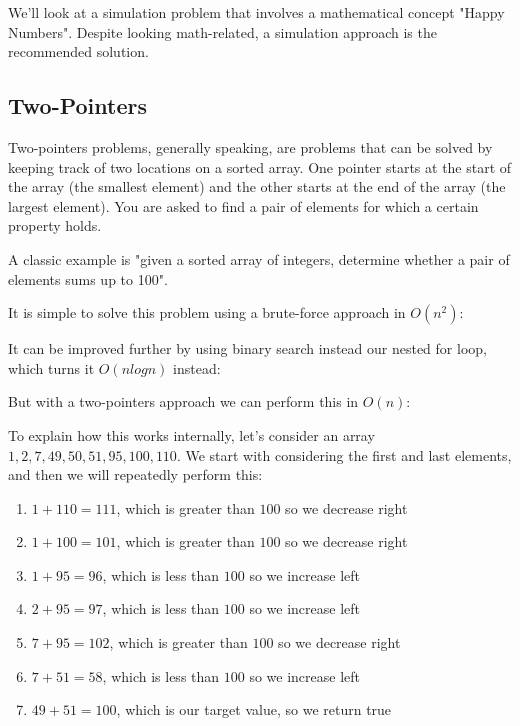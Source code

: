 We'll look at a simulation problem that involves a mathematical concept "Happy Numbers". Despite looking math-related, a simulation approach is the recommended solution.

\hrulefill



\hrulefill

\subsection{Two-Pointers}

Two-pointers problems, generally speaking, are problems that can be solved by keeping track of two locations on a sorted array. One pointer starts at the start of the array (the smallest element) and the other starts at the end of the array (the largest element). You are asked to find a pair of elements for which a certain property holds.

A classic example is "given a sorted array of integers, determine whether a pair of elements sums up to 100".

It is simple to solve this problem using a brute-force approach in $O(n^2)$:


It can be improved further by using binary search instead our nested for loop, which turns it $O(n log n)$ instead:


But with a two-pointers approach we can perform this in $O(n)$:


To explain how this works internally, let's consider an array $1,2,7,49,50,51,95,100,110$. We start with considering the first and last elements, and then we will repeatedly perform this:
\begin{enumerate}
\item $1 + 110 = 111$, which is greater than $100$ so we decrease right
\item $1 + 100 = 101$, which is greater than $100$ so we decrease right
\item $1 + 95 = 96$, which is less than $100$ so we increase left
\item $2 + 95 = 97$, which is less than $100$ so we increase left
\item $7 + 95 = 102$, which is greater than $100$ so we decrease right
\item $7 + 51 = 58$, which is less than $100$ so we increase left
\item $49 + 51 = 100$, which is our target value, so we return true
\end{enumerate}

